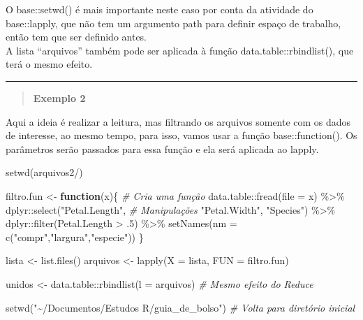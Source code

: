 \documentclass[
]{book}
\newenvironment{Shaded}{\begin{snugshade}}{\end{snugshade}}
\newcommand{\AttributeTok}[1]{\textcolor[rgb]{0.77,0.63,0.00}{#1}}
\newcommand{\CommentTok}[1]{\textcolor[rgb]{0.56,0.35,0.01}{\textit{#1}}}
\newcommand{\ControlFlowTok}[1]{\textcolor[rgb]{0.13,0.29,0.53}{\textbf{#1}}}
\newcommand{\DecValTok}[1]{\textcolor[rgb]{0.00,0.00,0.81}{#1}}
\newcommand{\FunctionTok}[1]{\textcolor[rgb]{0.00,0.00,0.00}{#1}}
\newcommand{\NormalTok}[1]{#1}
\newcommand{\OtherTok}[1]{\textcolor[rgb]{0.56,0.35,0.01}{#1}}
\newcommand{\SpecialCharTok}[1]{\textcolor[rgb]{0.00,0.00,0.00}{#1}}
\newcommand{\StringTok}[1]{\textcolor[rgb]{0.31,0.60,0.02}{#1}}
\theoremstyle{definition}
\theoremstyle{definition}
\theoremstyle{definition}
\theoremstyle{definition}
\theoremstyle{remark}
\begin{document}
O base::setwd() é mais importante neste caso por conta da atividade do base::lapply, que não tem um argumento path para definir espaço de trabalho, então tem que ser definido antes.\\
A lista ``arquivos'' também pode ser aplicada à função data.table::rbindlist(), que terá o mesmo efeito.

\begin{center}\rule{0.5\linewidth}{0.5pt}\end{center}

\begin{quote}
\textbf{Exemplo 2}
\end{quote}

Aqui a ideia é realizar a leitura, mas filtrando os arquivos somente com os dados de interesse, ao mesmo tempo, para isso, vamos usar a função base::function(). Os parâmetros serão passados para essa função e ela será aplicada ao lapply.

\begin{Shaded}
\begin{Highlighting}[]
\FunctionTok{setwd}\NormalTok{(}\StringTok{\textquotesingle{}arquivos2/\textquotesingle{}}\NormalTok{)}

\NormalTok{filtro.fun }\OtherTok{\textless{}{-}} \ControlFlowTok{function}\NormalTok{(x)\{                      }\CommentTok{\# Cria uma função}
\NormalTok{  data.table}\SpecialCharTok{::}\FunctionTok{fread}\NormalTok{(}\AttributeTok{file =}\NormalTok{ x) }\SpecialCharTok{\%\textgreater{}\%} 
\NormalTok{    dplyr}\SpecialCharTok{::}\FunctionTok{select}\NormalTok{(}\StringTok{"Petal.Length"}\NormalTok{,               }\CommentTok{\# Manipulações}
                  \StringTok{"Petal.Width"}\NormalTok{, }
                  \StringTok{"Species"}\NormalTok{) }\SpecialCharTok{\%\textgreater{}\%}
\NormalTok{    dplyr}\SpecialCharTok{::}\FunctionTok{filter}\NormalTok{(Petal.Length }\SpecialCharTok{\textgreater{}}\NormalTok{ .}\DecValTok{5}\NormalTok{) }\SpecialCharTok{\%\textgreater{}\%}
    \FunctionTok{setNames}\NormalTok{(}\AttributeTok{nm =} \FunctionTok{c}\NormalTok{(}\StringTok{"compr"}\NormalTok{,}\StringTok{"largura"}\NormalTok{,}\StringTok{"especie"}\NormalTok{))}
\NormalTok{\}}

\NormalTok{lista }\OtherTok{\textless{}{-}} \FunctionTok{list.files}\NormalTok{()}
\NormalTok{arquivos }\OtherTok{\textless{}{-}} \FunctionTok{lapply}\NormalTok{(}\AttributeTok{X =}\NormalTok{ lista, }\AttributeTok{FUN =}\NormalTok{ filtro.fun)}

\NormalTok{unidos }\OtherTok{\textless{}{-}}\NormalTok{ data.table}\SpecialCharTok{::}\FunctionTok{rbindlist}\NormalTok{(}\AttributeTok{l =}\NormalTok{ arquivos)  }\CommentTok{\# Mesmo efeito do Reduce}

\FunctionTok{setwd}\NormalTok{(}\StringTok{"\textasciitilde{}/Documentos/Estudos R/guia\_de\_bolso"}\NormalTok{) }\CommentTok{\# Volta para diretório inicial}
\end{Highlighting}
\end{Shaded}
\end{document}

